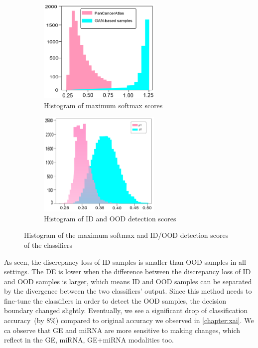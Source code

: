 \begin{figure}[h]
	\centering
	\begin{subfigure}{.48\linewidth}
		\centering
		\includegraphics[width=\linewidth,height=50mm]{images/ood_detection.png}
		\caption{Histogram of maximum softmax scores}
        \label{fig:max_soft_score}
	\end{subfigure}
	\begin{subfigure}{0.48\linewidth}
		\centering
		\includegraphics[width=\linewidth,height=50mm]{images/hist_max_softmax.png}
		\caption{Histogram of ID and OOD detection scores}
		\label{fig:id_ood_de_scores}
	\end{subfigure}
	\caption{Histogram of the maximum softmax and ID/OOD detection scores of the classifiers} 
	\label{fig:max_soft_scores_and_de_scores}
\end{figure}

\hspace*{3.5mm} As seen, the discrepancy loss of ID samples is smaller than OOD samples in all settings. The DE is lower when the difference between the discrepancy loss of ID and OOD samples is larger, which means ID and OOD samples can be separated by the divergence between the two classifiers' output. Since this method needs to fine-tune the classifiers in order to detect the OOD samples, the decision boundary changed slightly. Eventually, we see a significant drop of classification accuracy~(by 8\%) compared to original accuracy we observed in \cref{chapter:xai}. We ca observe that GE and miRNA are more sensitive to making changes, which reflect in the GE, miRNA, GE+miRNA modalities too. 

